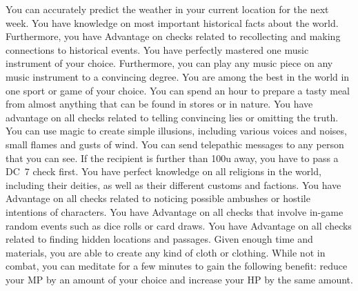\vfill
{}
{
	You can accurately predict the weather in your current location for the next week.
}
\vfill
{}
{
	You have knowledge on most important historical facts about the world.
	Furthermore, you have Advantage on checks related to recollecting and making connections to  historical events. 	 
}
\vfill
{}
{
	You have perfectly mastered one music instrument of your choice.
	Furthermore, you can play any music piece on any music instrument to a convincing degree.
}
\vfill
{}
{
	You are among the best in the world in one sport or game of your choice.
}
\vfill
{}
{
	You can spend an hour to prepare a tasty meal from almost anything that can be found in stores or in nature.
}
\vfill
{}
{
	You have advantage on all checks related to telling convincing lies or omitting the truth.
}
\vfill
{}
{
	You can use magic to create simple illusions, including various voices and noises, small flames and gusts of wind.
}
\vfill
{}
{
	You can send telepathic messages to any person that you can see.
	If the recipient is further than 100u away, you have to pass a DC~7 check first.
}
\vfill
{}
{
	You have perfect knowledge on all religions in the world, including their deities, as well as their different customs and factions.
}
\vfill
{}
{
	You have Advantage on all checks related to noticing possible ambushes or hostile intentions of characters.
}
\vfill
{}
{
	You have Advantage on all checks that involve in-game random events such as dice rolls or card draws.
}
\vfill
{}
{
	You have Advantage on all checks related to finding hidden locations and passages. 	 
}
\vfill
{}
{
	Given enough time and materials, you are able to create any kind of cloth or clothing.
}
\vfill
{}
{
	While not in combat, you can meditate for a few minutes to gain the following benefit: reduce your MP by an amount of your choice and increase your HP by the same amount.
}
%
\clearpage